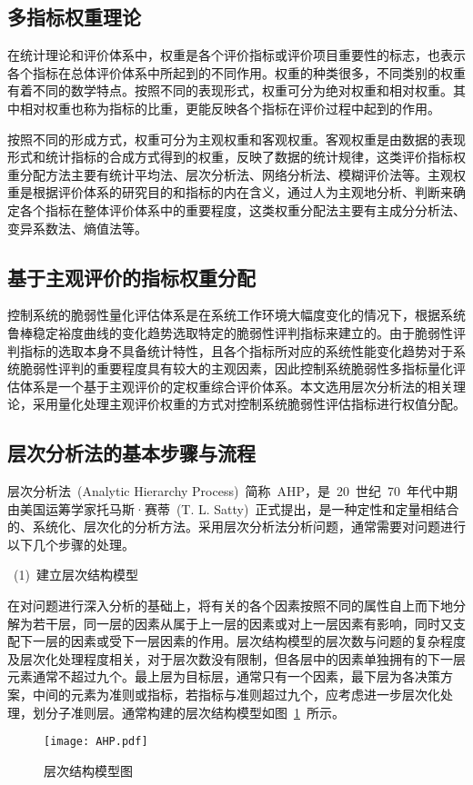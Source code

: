 \subsection{多指标权重理论}
在统计理论和评价体系中，权重是各个评价指标或评价项目重要性的标志，也表示各个指标在总体评价体系中所起到的不同作用。权重的种类很多，不同类别的权重有着不同的数学特点。按照不同的表现形式，权重可分为绝对权重和相对权重。其中相对权重也称为指标的比重，更能反映各个指标在评价过程中起到的作用。

按照不同的形成方式，权重可分为主观权重和客观权重。客观权重是由数据的表现形式和统计指标的合成方式得到的权重，反映了数据的统计规律，这类评价指标权重分配方法主要有统计平均法、层次分析法、网络分析法、模糊评价法等。主观权重是根据评价体系的研究目的和指标的内在含义，通过人为主观地分析、判断来确定各个指标在整体评价体系中的重要程度，这类权重分配法主要有主成分分析法、变异系数法、熵值法等。

\subsection{基于主观评价的指标权重分配}
控制系统的脆弱性量化评估体系是在系统工作环境大幅度变化的情况下，根据系统鲁棒稳定裕度曲线的变化趋势选取特定的脆弱性评判指标来建立的。由于脆弱性评判指标的选取本身不具备统计特性，且各个指标所对应的系统性能变化趋势对于系统脆弱性评判的重要程度具有较大的主观因素，因此控制系统脆弱性多指标量化评估体系是一个基于主观评价的定权重综合评价体系。本文选用层次分析法的相关理论，采用量化处理主观评价权重的方式对控制系统脆弱性评估指标进行权值分配。

\subsection{层次分析法的基本步骤与流程}
层次分析法~(Analytic Hierarchy Process)~简称~AHP，是~20~世纪~70~年代中期由美国运筹学家托马斯·赛蒂~(T. L. Satty)~正式提出，是一种定性和定量相结合的、系统化、层次化的分析方法。采用层次分析法分析问题，通常需要对问题进行以下几个步骤的处理。

~(1)~建立层次结构模型

在对问题进行深入分析的基础上，将有关的各个因素按照不同的属性自上而下地分解为若干层，同一层的因素从属于上一层的因素或对上一层因素有影响，同时又支配下一层的因素或受下一层因素的作用。层次结构模型的层次数与问题的复杂程度及层次化处理程度相关，对于层次数没有限制，但各层中的因素单独拥有的下一层元素通常不超过九个。最上层为目标层，通常只有一个因素，最下层为各决策方案，中间的元素为准则或指标，若指标与准则超过九个，应考虑进一步层次化处理，划分子准则层。通常构建的层次结构模型如图~\ref{fig:chap4:ahp}~所示。
\begin{figure}[h]
\centering
\texttt{[image: AHP.pdf]}
\caption{层次结构模型图}\label{fig:chap4:ahp}
\end{figure}

